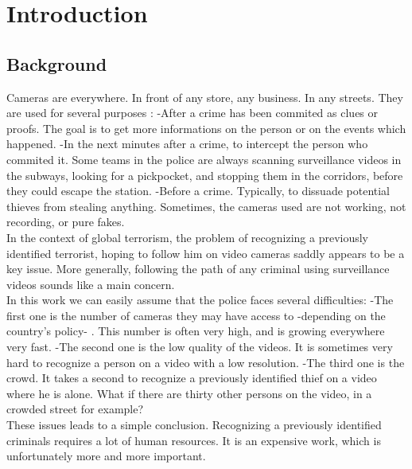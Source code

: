 \setlength{\footskip}{8mm}
\mainmatter
\chapter{Introduction}

\section{Background}


Cameras are everywhere. In front of any store, any business. In any streets. They are used for several purposes :\newline
-After a crime has been commited as clues or proofs. The goal is to get more informations on the person or on the events which happened.\newline
-In the next minutes after a crime, to intercept the person who commited it. Some teams in the police are always scanning surveillance videos in the subways, looking for a pickpocket, and stopping them in the corridors, before they could escape the station.\newline
-Before a crime. Typically, to dissuade potential thieves from stealing anything. Sometimes, the cameras used are not working, not recording, or pure fakes.\\

In the context of global terrorism, the problem of recognizing a previously identified terrorist, hoping to follow him on video cameras saddly appears to be a key issue. More generally, following the path of any criminal using surveillance videos sounds like a main concern.\\

In this work we can easily assume that the police faces several difficulties:\newline
-The first one is the number of cameras they may have access to -depending on the country's policy- . This number is often very high, and is growing everywhere very fast.\newline
-The second one is the low quality of the videos. It is sometimes very hard to recognize a person on a video with a low resolution.\newline
-The third one is the crowd. It takes a second to recognize a previously identified thief on a video where he is alone. What if there are thirty other persons on the video, in a crowded street for example? \\

These issues leads to a simple conclusion. Recognizing a previously identified criminals requires a lot of human resources. It is an expensive work, which is unfortunately more and more important.\\

